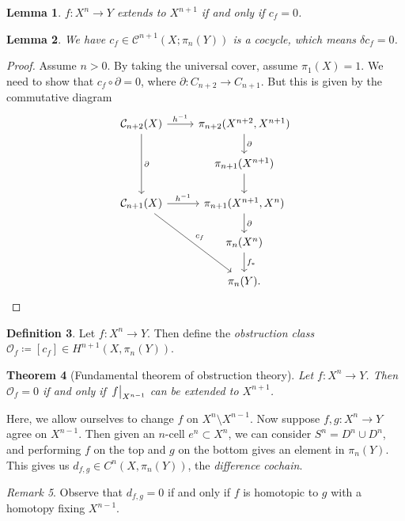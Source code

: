 \documentclass[leqno, openany]{memoir}
\newtheorem{thm}{Theorem}[section]
\newtheorem{lem}[thm]{Lemma}
\theoremstyle{definition}
\newtheorem{defn}[thm]{Definition}
\theoremstyle{remark}
\newtheorem{rmk}[thm]{Remark}
\theoremstyle{plain}
\theoremstyle{definition}
\theoremstyle{remark}
\newcommand{\mc}[1]{\mathcal{#1}}
\begin{document}
\begin{lem}
    $f \colon X^n \to Y$ extends to $X^{n+1}$ if and only if $c_f = 0$.
\end{lem}

\begin{lem}
    We have $c_f \in \mc{C}^{n+1}(X; \pi_n(Y))$ is a cocycle, which means $\delta c_f = 0$.
\end{lem}

\begin{proof}
    Assume $n > 0$. By taking the universal cover, assume $\pi_1(X) = 1$. We need to show that $c_f \circ \partial = 0$, where $\partial \colon C_{n+2} \to C_{n+1}$. But this is given by the commutative diagram
    \begin{equation*}
    \begin{tikzcd}
        \mc{C}_{n+2}(X) \ar{r}{h^{-1}} \ar{dd}{\partial} & \pi_{n+2}(X^{n+2}, X^{n+1}) \ar{d}{\partial} \\
                                            & \pi_{n+1}(X^{n+1}) \ar{d} \\
        \mc{C}_{n+1}(X) \ar{r}{h^{-1}} \ar{ddr}{c_f} & \pi_{n+1}(X^{n+1}, X^n) \ar{d}{\partial} \\
                                  & \pi_n(X^n) \ar{d}{f_*} \\
                                  & \pi_n(Y). \qedhere
    \end{tikzcd}
    \end{equation*}
\end{proof}

\begin{defn}
    Let $f \colon X^n \to Y$. Then define the \textit{obstruction class} $\mc{O}_f \coloneqq [c_f] \in H^{n+1}(X, \pi_n(Y))$.
\end{defn}

\begin{thm}[Fundamental theorem of obstruction theory]
    Let $f \colon X^n \to Y$. Then $\mc{O}_f = 0$ if and only if $\eval{f}_{X^{n-1}}$ can be extended to $X^{n+1}$.
\end{thm}

Here, we allow ourselves to change $f$ on $X^n \setminus X^{n-1}$. Now suppose $f, g \colon X^n \to Y$ agree on $X^{n-1}$. Then given an $n$-cell $e^n \subset X^n$, we can consider $S^n = D^n \cup D^n$, and performing $f$ on the top and $g$ on the bottom gives an element in $\pi_n(Y)$. This gives us $d_{f, g} \in C^n(X, \pi_n(Y))$, the \textit{difference cochain}. 

\begin{rmk}
    Observe that $d_{f,g} = 0$ if and only if $f$ is homotopic to $g$ with a homotopy fixing $X^{n-1}$.
\end{rmk}
\end{document}
